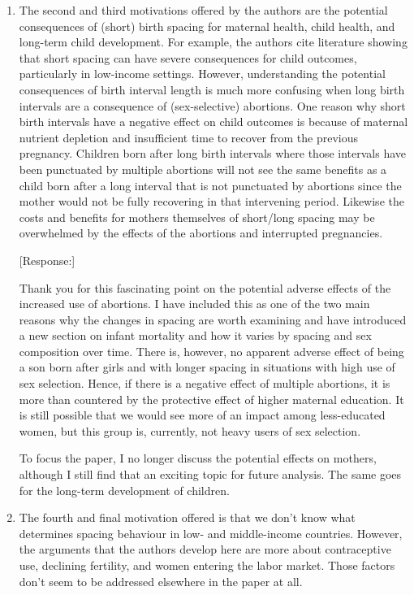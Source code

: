 \documentclass[letterpaper,12pt]{article}
\begin{document}
\begin{enumerate}
\item The second and third motivations offered by the authors are the
potential consequences of (short) birth spacing for maternal health,
child health, and long-term child development. For example, the authors
cite literature showing that short spacing can have severe consequences
for child outcomes, particularly in low-income settings. However,
understanding the potential consequences of birth interval length is
much more confusing when long birth intervals are a consequence of
(sex-selective) abortions. One reason why short birth intervals have a
negative effect on child outcomes is because of maternal nutrient
depletion and insufficient time to recover from the previous pregnancy.
Children born after long birth intervals where those intervals have been
punctuated by multiple abortions will not see the same benefits as a
child born after a long interval that is not punctuated by abortions
since the mother would not be fully recovering in that intervening
period. Likewise the costs and benefits for mothers themselves of
short/long spacing may be overwhelmed by the effects of the abortions
and interrupted pregnancies.

[Response:]

Thank you for this fascinating point on the potential adverse effects of
the increased use of abortions. I have included this as one of the two
main reasons why the changes in spacing are worth examining and have
introduced a new section on infant mortality and how it varies by
spacing and sex composition over time. There is, however, no apparent
adverse effect of being a son born after girls and with longer spacing
in situations with high use of sex selection. Hence, if there is a
negative effect of multiple abortions, it is more than countered by the
protective effect of higher maternal education. It is still possible
that we would see more of an impact among less-educated women, but this
group is, currently, not heavy users of sex selection.

To focus the paper, I no longer discuss the potential effects on
mothers, although I still find that an exciting topic for future
analysis. The same goes for the long-term development of children.



\item The fourth and final motivation offered is that we don’t know what
determines spacing behaviour in low- and middle-income countries.
However, the arguments that the authors develop here are more about 
contraceptive use, declining fertility, and women entering the labor market. 
Those factors don’t seem to be addressed elsewhere in the paper at all.


\end{enumerate}
\end{document}
